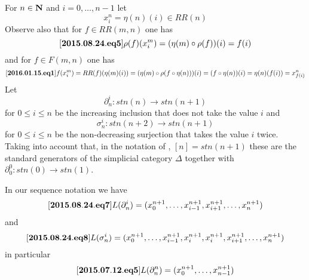 \documentclass[11pt]{article}
\newenvironment{eq}{\begin{equation}}{\end{equation}}
\newcommand{\llabel}[1]{\label{#1}[{\bf #1}]}
\newcommand{\sr}{\rightarrow}
\newcommand{\nn}{{\bf N\rm}}
\newcommand{\nat}{\nn}
\newcommand{\mbind}{\rho}
\begin{document}
%
For $n\in\nat$ and $i=0,\dots,n-1$ let
%
$$x_i^n=\eta(n)(i)\in RR(n)$$
%
Observe also that for $f\in RR(m,n)$ one has
%
\begin{eq}\llabel{2015.08.24.eq5}
\mbind(f)(x_i^m)=(\eta(m)\circ\mbind(f))(i)=f(i)
\end{eq}
%
and for $f\in F(m,n)$ one has
%
\begin{eq}\llabel{2016.01.15.eq1}
f(x_i^m)=RR(f)(\eta(m)(i))=(\eta(m)\circ \mbind(f\circ \eta(n)))(i)=(f\circ \eta(n))(i)=\eta(n)(f(i))=x_{f(i)}^n
\end{eq}
%
Let 
%
$$\partial^{i}_{n}:stn(n)\sr stn(n+1)$$
%
for $0\le i\le n$ be the increasing inclusion that does not take the value $i$ and
%
$$\sigma^{i}_{n}:stn(n+2)\sr stn(n+1)$$
%
for $0\le i\le n$ be the non-decreasing surjection that takes the value $i$ twice. Taking into account that, in the notation of \cite{GabZis}, $[n]=stn(n+1)$ these are the standard generators of the simplicial category $\Delta$ together with $\partial^0_0:stn(0)\sr stn(1)$. 

In our sequence notation we have
%
\begin{eq}\llabel{2015.08.24.eq7}
L(\partial^{i}_{n})=(x_0^{n+1},\dots,x_{i-1}^{n+1},x_{i+1}^{n+1},\dots,x_n^{n+1})
\end{eq}
%
and
%
\begin{eq}\llabel{2015.08.24.eq8}
L(\sigma^{i}_{n})=(x_0^{n+1},\dots,x_{i-1}^{n+1},x_i^{n+1},x_i^{n+1},x_{i+1}^{n+1},\dots,x_n^{n+1})
\end{eq}
%
in particular
%
\begin{eq}\llabel{2015.07.12.eq5}
L(\partial^{n}_n)=(x_0^{n+1},\dots,x_{n-1}^{n+1})
\end{eq}
%
\end{document}
